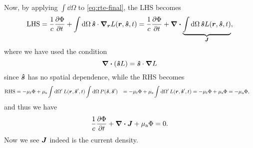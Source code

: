 \documentclass[hyperref, a4paper]{article}
\def\\{}%
\begin{document}
Now, by applying $\int \dd{\Omega}$ to \eqref{eq:rte-final}, the LHS becomes 
\begin{equation}
    \text{LHS} = \frac{1}{c} \pdv{\Phi}{t} 
    + \int \dd{\Omega} \vu*{s} \cdot \grad_{\vb*{r}} L(\vb*{r}, \vu*{s}, t)
    = \frac{1}{c} \pdv{\Phi}{t} 
    + \div \underbrace{
        \int \dd{\Omega} \vu*{s}  L(\vb*{r}, \vu*{s}, t) 
    }_{\vb*{J}}, 
\end{equation}
where we have used the condition 
\begin{equation}
    \div(\vu*{s} L) = \vu*{s} \cdot \grad L
    \label{eq:move-grad-1}
\end{equation} 
since $\vu*{s}$ has no spatial dependence, 
while the RHS becomes 
\begin{equation}
    \begin{aligned}
        \text{RHS} &= - \mu_{t} \Phi 
        + \mu_{\text{s}} \int \dd{\Omega'} L(\vb*{r}, \vu*{s}', t) \int \dd{\Omega} P(\vu*{s}, \vu*{s}') \\
        &= - \mu_{t} \Phi 
        + \mu_{\text{s}} \int \dd{\Omega'} L(\vb*{r}, \vu*{s}', t) \\
        &= - \mu_{t} \Phi 
        + \mu_{\text{s}} \Phi = - \mu_{\text{a}} \Phi ,
    \end{aligned}
\end{equation}
and thus we have 
\begin{equation}
    \frac{1}{c} \pdv{\Phi}{t} + \div{\vb*{J}} + \mu_{\text{a}} \Phi = 0.
\end{equation}
Now we see $\vb*{J}$ indeed is the current density.
\end{document}
